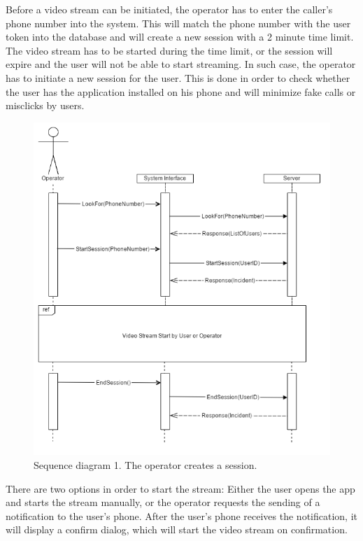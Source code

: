 \documentclass{article}
\begin{document}
Before a video stream can be initiated, the operator has to enter the caller’s phone number into the system. This will match the phone number with the user token into the database and will create a new session with a 2 minute time limit. The video stream has to be started during the time limit, or the session will expire and the user will not be able to start streaming. In such case, the operator has to initiate a new session for the user. This is done in order to check whether the user has the application installed on his phone and will minimize fake calls or misclicks by users.
	\begin{figure}[H]
		\centering
		\includegraphics[width=1\textwidth]{"EmergencyAppIteration1/sequenceinitiatesession (2)"}
		Sequence diagram 1. The operator creates a session.
	\end{figure}

There are two options in order to start the stream: Either the user opens the app and starts the stream manually, or the operator requests the sending of a notification to the user’s phone. After the user’s phone receives the notification, it will display a confirm dialog, which will start the video stream on confirmation.\\
\end{document}
